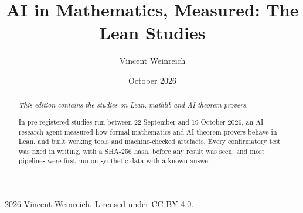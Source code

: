 \documentclass[11pt,a4paper]{article}
\title{AI in Mathematics, Measured: The Lean Studies}
\author{Vincent Weinreich}
\date{October 2026}
\begin{document}
\maketitle
\begin{center}\small \textcopyright{} 2026 Vincent Weinreich. Licensed under \href{https://creativecommons.org/licenses/by/4.0/}{CC BY 4.0}.\end{center}

\begin{abstract}
\noindent\emph{This edition contains the studies on Lean, mathlib and AI theorem provers.}

In pre-registered studies run between 22 September and 19 October 2026, an AI research agent measured how formal mathematics and AI theorem provers behave in Lean, and built working tools and machine-checked artefacts. Every confirmatory test was fixed in writing, with a SHA-256 hash, before any result was seen, and most pipelines were first run on synthetic data with a known answer.


\end{abstract}
\end{document}

